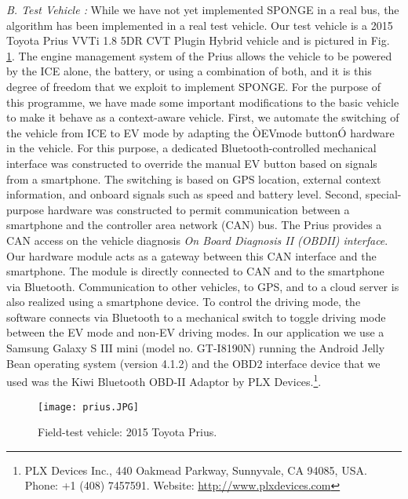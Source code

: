 \documentclass[journal]{IEEEtran}
\begin{document}
{\em B.  Test Vehicle :} While we have not yet implemented SPONGE in a real bus, the algorithm has been implemented  in a real test vehicle.  Our test vehicle is a 2015 Toyota Prius VVTi 1.8 5DR CVT Plugin Hybrid vehicle and is pictured in Fig. \ref{f1}.  The engine management system of the Prius allows the vehicle to be powered by the ICE alone, the battery, or using a combination of both, and it is this degree of freedom that we exploit to implement SPONGE.  For the purpose of this programme, we have made some important modifications to the basic vehicle to make it behave as a context-aware vehicle. First, we automate the switching of the vehicle from ICE to EV mode by adapting the ÒEVmode buttonÓ hardware in the vehicle. For this purpose, a dedicated Bluetooth-controlled mechanical interface was constructed to override the manual EV button based on signals from a smartphone. The switching is based on GPS location, external context information, and onboard signals such as speed and battery level. Second, special-purpose hardware was constructed to permit communication between a smartphone and the controller area network (CAN) bus. The Prius provides a CAN access on the vehicle diagnosis {\em On Board Diagnosis II (OBDII) interface}. Our hardware module acts as a gateway between this CAN interface and the smartphone.
The module is directly connected to CAN and to the smartphone via Bluetooth.  Communication to other vehicles, to GPS, and to a cloud server is also realized using a smartphone device. To control the driving mode, the software connects via Bluetooth to a mechanical switch to
toggle driving mode between the EV mode and non-EV driving modes.  In our application we use a Samsung Galaxy S III mini (model no. GT-I8190N) running the Android Jelly Bean operating system (version 4.1.2) and the OBD2 interface device that we used was the Kiwi Bluetooth OBD-II Adaptor by PLX Devices.\footnote{PLX Devices Inc., 440 Oakmead Parkway, Sunnyvale, CA 94085, USA.  Phone:  +1 (408) 7457591.  Website:  \url{http://www.plxdevices.com}}. \newline

\begin{figure}[t]
	\centering
	\texttt{[image: prius.JPG]}
	\caption{Field-test vehicle:  2015 Toyota Prius.}\label{f1}
\end{figure}
\end{document}
